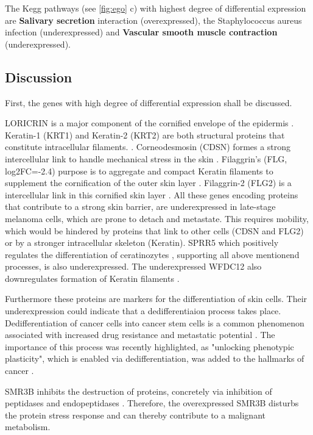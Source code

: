 \documentclass[twoside]{article}
\begin{document}
The Kegg pathways (see \ref{fig:ego} c) with highest degree of differential expression are  \textbf{Salivary secretion} interaction (overexpressed), the {Staphylococcus aureus infection} (underexpressed) and \textbf{Vascular smooth muscle contraction} (underexpressed).


\subsection{Discussion}


First, the genes with high degree of differential expression shall be discussed.

LORICRIN is a major component of the cornified envelope of the epidermis \cite{Candi2005}. Keratin-1 (KRT1) and Keratin-2 (KRT2) are both structural proteins that constitute intracellular filaments. \cite{KRT1, KRT2, Candi2005}. Corneodesmosin (CDSN) formes a strong intercellular link to handle mechanical stress in the skin \cite{GARROD2008572}. Filaggrin's (FLG, log2FC=-2.4) purpose is to aggregate and compact Keratin filaments to supplement the cornification of the outer skin layer \cite{ARMENGOTCARBO201586}. Filaggrin-2 (FLG2) is a intercellular link in this cornified skin layer \cite{FLG2}. All these genes encoding proteins that contribute to a strong skin barrier, are underexpressed in late-stage melanoma cells, which are prone to detach and metastate. This requires mobility, which would be hindered by proteins that link to other cells (CDSN and FLG2) or by a stronger intracellular skeleton (Keratin). SPRR5 which positively regulates the differentiation of ceratinozytes \cite{Ziegler2019}, supporting all above mentionend processes,  is also underexpressed. The underexpressed WFDC12  also downregulates formation of Keratin filaments \cite{Kalinina2021}. 

Furthermore these proteins are markers for the differentiation of skin cells. Their underexpression could indicate that a dedifferentiaion process takes place. Dedifferentiation of cancer cells into cancer stem cells is a common phenomenon associated with increased drug resistance and metastatic potential \cite{Cancer_dedif_CancerStemCells}. The importance of this process was recently highlighted, as "unlocking phenotypic plasticity", which is enabled via dedifferentiation,  was added to the hallmarks of cancer \cite{hallmarks_new}.

SMR3B inhibits the destruction of proteins, concretely via inhibition of  peptidases and endopeptidases \cite{SMR3B}. Therefore, the overexpressed SMR3B disturbs the protein stress response and can thereby contribute to a malignant metabolism.
\end{document}
